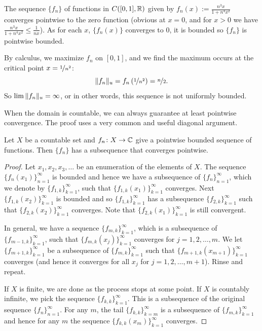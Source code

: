 \begin{example}
The sequence $\{ f_n \}$ of functions in $C([0,1],{\mathbb{R}})$ given by $f_n(x) :=
\frac{n^3x}{1+n^4x^2}$
converges pointwise to the zero function (obvious at $x=0$, and for $x > 0$
we have $\frac{n^3x}{1+n^4x^2} \leq \frac{1}{nx}$).
As for each $x$, $\{f_n(x)\}$ converges to 0, it is bounded
so $\{ f_n \}$ is pointwise bounded.

By calculus, we maximize $f_n$ on
$[0,1]$, and we find the maximum occurs at the critical point
$x=\nicefrac{1}{n^2}$:
\begin{equation*}
\lVert {f_n} \rVert_u
=
f_n\left(\nicefrac{1}{n^2}\right)
= \nicefrac{n}{2} .
\end{equation*}
So $\lim\, \lVert {f_n} \rVert_u = \infty$, or in other words,
this sequence is not uniformly bounded.
\end{example}

When the domain is countable, we can always guarantee at least pointwise
convergence.
The proof uses a very common and useful diagonal argument.

\begin{prop} \label{prop:subsequenceoncountableX}
Let $X$ be a countable set and $f_n \colon X \to {\mathbb{C}}$ give a pointwise bounded
sequence of functions.  Then $\{ f_n \}$ has a subsequence that converges
pointwise.
\end{prop}

\begin{proof}
Let $x_1,x_2,x_3,\ldots$ be an enumeration of the elements of $X$.
The sequence $\{ f_n(x_1) \}_{n=1}^\infty$ is bounded and hence
we have a subsequence of $\{ f_n \}_{n=1}^{\infty}$, which we denote by
$\{ f_{1,k} \}_{k=1}^\infty$,
such that
$\{ f_{1,k}(x_1) \}_{k=1}^\infty$ converges.
Next $\{ f_{1,k}(x_2) \}_{k=1}^\infty$ is bounded and so 
$\{ f_{1,k} \}_{k=1}^\infty$ has a subsequence
$\{ f_{2,k} \}_{k=1}^\infty$ such that
$\{ f_{2,k}(x_2) \}_{k=1}^\infty$ converges.  Note that
$\{ f_{2,k}(x_1) \}_{k=1}^\infty$ is still convergent.

In general, we have a sequence $\{ f_{m,k} \}_{k=1}^\infty$,
which is a subsequence of $\{ f_{m-1,k} \}_{k=1}^\infty$,
such that $\{ f_{m,k}(x_j) \}_{k=1}^\infty$ converges for $j=1,2,\ldots, m$.
We let $\{ f_{m+1,k} \}_{k=1}^\infty$ be a subsequence of
$\{ f_{m,k} \}_{k=1}^\infty$
such that
$\{ f_{m+1,k}(x_{m+1}) \}_{k=1}^\infty$ converges (and hence it converges for all
$x_j$ for $j=1,2,\ldots,m+1$).  Rinse and repeat.

If $X$ is finite, we are done as the process stops at some point.
If $X$ is countably infinite,
we pick the sequence
$\{ f_{k,k} \}_{k=1}^\infty$.
This is a subsequence of the original sequence $\{ f_n \}_{n=1}^\infty$.
For any $m$, the tail $\{ f_{k,k} \}_{k=m}^\infty$ is a subsequence of $\{ f_{m,k}
\}_{k=1}^\infty$
and hence for any $m$ the sequence $\{ f_{k,k}(x_m) \}_{k=1}^\infty$ converges.
\end{proof}

